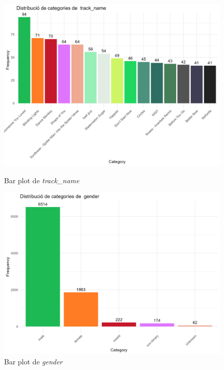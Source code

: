 \begin{figure}[H]
\centering
    \begin{minipage}{.4\textwidth}
        \centering
        \includegraphics[width=0.95\linewidth]{Images/3_Preprocessing/bar_track_name.png}
        \caption{Bar plot de \textit{track\_name}}
        \label{fig:UnivariateP_track}
    \end{minipage}%
    \begin{minipage}{.4\textwidth}
        \centering
        \includegraphics[width=0.95\linewidth]{Images/3_Preprocessing/bar_gender.png}
        \caption{Bar plot de \textit{gender}}
        \label{fig:UnivariateP_gender}
    \end{minipage}%
\end{figure}

